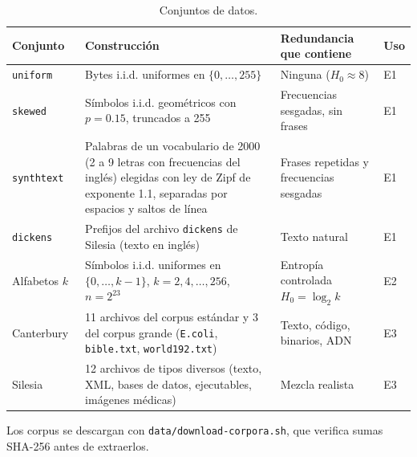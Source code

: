 \begin{table}[H]
  \centering
  \caption{Conjuntos de datos.}
  \label{tab:datos}
  \small
  \renewcommand{\arraystretch}{1.12}
  \begin{tabularx}{\linewidth}{@{}>{\raggedright}p{2.6cm} >{\raggedright}X >{\raggedright}p{4.0cm} >{\raggedright\arraybackslash}p{1.4cm}@{}}
    \toprule
    Conjunto & Construcción & Redundancia que contiene & Uso \\
    \midrule
    \texttt{uniform} & Bytes i.i.d. uniformes en $\{0,\dots,255\}$ & Ninguna ($H_0 \approx 8$) & E1 \\
    \texttt{skewed} & Símbolos i.i.d. geométricos con $p = 0.15$, truncados a 255 & Frecuencias sesgadas, sin frases & E1 \\
    \texttt{synthtext} & Palabras de un vocabulario de 2000 (2 a 9 letras con frecuencias del inglés) elegidas con ley de Zipf de exponente 1.1, separadas por espacios y saltos de línea & Frases repetidas y frecuencias sesgadas & E1 \\
    \texttt{dickens} & Prefijos del archivo \texttt{dickens} de Silesia (texto en inglés) & Texto natural & E1 \\
    Alfabetos $k$ & Símbolos i.i.d. uniformes en $\{0,\dots,k-1\}$, $k = 2, 4, \dots, 256$, $n = 2^{23}$ & Entropía controlada $H_0 = \log_2 k$ & E2 \\
    Canterbury~\cite{arnold1997} & 11 archivos del corpus estándar y 3 del corpus grande (\texttt{E.coli}, \texttt{bible.txt}, \texttt{world192.txt}) & Texto, código, binarios, ADN & E3 \\
    Silesia~\cite{deorowicz2003} & 12 archivos de tipos diversos (texto, XML, bases de datos, ejecutables, imágenes médicas) & Mezcla realista & E3 \\
    \bottomrule
  \end{tabularx}
\end{table}

Los corpus se descargan con \texttt{data/download-corpora.sh}, que verifica sumas SHA-256 antes
de extraerlos.


